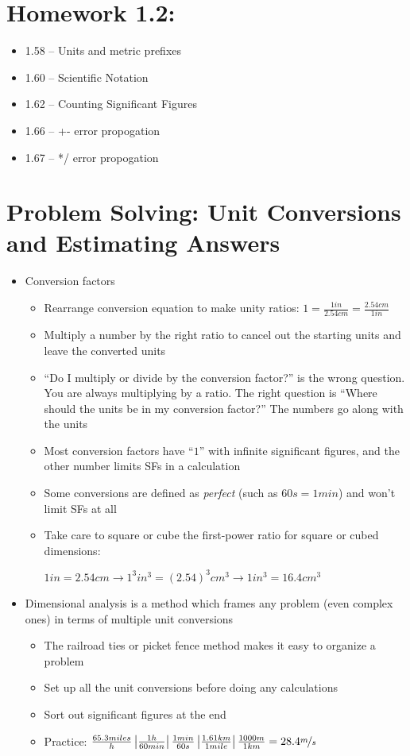 \documentclass[12pt, openany, letterpaper]{memoir}
\begin{document}
\section*{Homework 1.2:}
\begin{itemize}
	\item 1.58 -- Units and metric prefixes
	\item 1.60 -- Scientific Notation
	\item 1.62 -- Counting Significant Figures
	\item 1.66 -- +- error propogation
	\item 1.67 -- */ error propogation
\end{itemize}

\section{Problem Solving: Unit Conversions and Estimating Answers}
\begin{itemize}
	\item Conversion factors
	      \begin{itemize}
		      \item Rearrange conversion equation to make unity ratios: $1=\frac{1in}{2.54cm}=\frac{2.54cm}{1in}$
		      \item Multiply a number by the right ratio to cancel out the starting units and leave the converted units
		      \item ``Do I multiply or divide by the conversion factor?'' is the wrong question. You are always multiplying by a ratio. The right question is ``Where should the units be in my conversion factor?'' The numbers go along with the units
		      \item Most conversion factors have ``$1$'' with infinite significant figures, and the other number limits SFs in a calculation
		      \item Some conversions are defined as \emph{perfect} (such as $60s=1min$) and won't limit SFs at all
		      \item Take care to square or cube the first-power ratio for square or cubed dimensions:

		            $1in=2.54cm\rightarrow1^3in^3=\left(2.54\right)^3cm^3\rightarrow 1in^3=16.4cm^3$
	      \end{itemize}
	\item Dimensional analysis is a method which frames any problem (even complex ones) in terms of multiple unit conversions
	      \begin{itemize}
		      \item The railroad ties or picket fence method makes it easy to organize a problem
		      \item Set up all the unit conversions before doing any calculations
		      \item Sort out significant figures at the end
		      \item Practice: $\frac{65.3miles}{h}\left|\frac{1h}{60min}\right|\frac{1min}{60s}\left|\frac{1.61km}{1mile}\right|\frac{1000m}{1km}=28.4\nicefrac{m}{s}$
	      \end{itemize}
\end{itemize}
\end{document}
